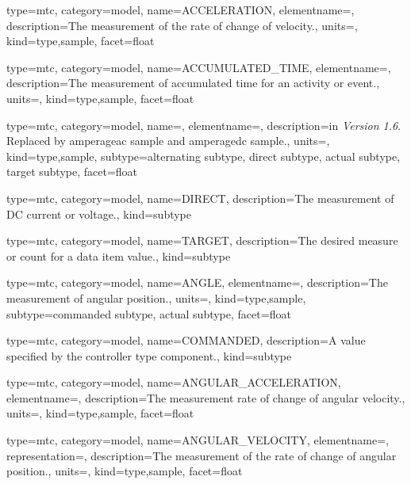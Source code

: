 {
  type=mtc,
  category=model,
  name={ACCELERATION},
  elementname=,
  description={The measurement of the rate of change of velocity.},
  units=,
  kind={type,sample},
  facet={\gls{float}}
}


{
  type=mtc,
  category=model,
  name={ACCUMULATED\_TIME},
  elementname=,
  description={The measurement of accumulated time for an activity or event.},
  units=,
  kind={type,sample},
  facet={\gls{float}}
}


{
  type=mtc,
  category=model,
  name=,
  elementname=,
  description={\DEPRECATED in \textit{Version 1.6}. Replaced by \gls{amperageac sample} and \gls{amperagedc sample}.},
  units=,
  kind={type,sample},
  subtype={\gls{alternating subtype}, \gls{direct subtype}, \gls{actual subtype}, \gls{target subtype}},
  facet={\gls{float}}
}

{
  type=mtc,
  category=model,
  name={DIRECT},
  description={The measurement of DC current or voltage.},
  kind={subtype}
}


{
  type=mtc,
  category=model,
  name={TARGET},
  description={The desired measure or count for a data item value.},
  kind={subtype}
}


{
  type=mtc,
  category=model,
  name={ANGLE},
  elementname=,
  description={The measurement of angular position.},
  units=,
  kind={type,sample},
  subtype={\gls{commanded subtype}, \gls{actual subtype}},
  facet={\gls{float}}
}


{
  type=mtc,
  category=model,
  name={COMMANDED},
  description={A value specified by the \gls{controller} type component.},
  kind={subtype}
}


{
  type=mtc,
  category=model,
  name={ANGULAR\_ACCELERATION},
  elementname=,
  description={The measurement rate of change of angular velocity.},
  units=,
  kind={type,sample},
  facet={\gls{float}}
}


{
  type=mtc,
  category=model,
  name={ANGULAR\_VELOCITY},
  elementname=,
  representation=,
  description={The measurement of the rate of change of angular position.},
  units=,
  kind={type,sample},
  facet={\gls{float}}
}


